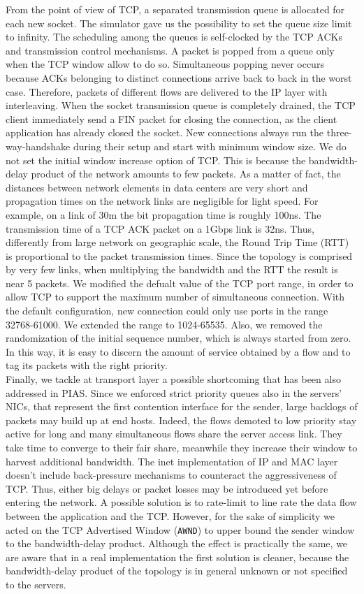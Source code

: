 From the point of view of TCP, a separated transmission queue is allocated for each new socket. The simulator gave us the possibility to set the queue size limit to infinity. The scheduling among the queues is self-clocked by the TCP ACKs and transmission control mechanisms. A packet is popped from a queue only when the TCP window allow to do so. Simultaneous popping never occurs because ACKs belonging to distinct connections arrive back to back in the worst case. Therefore, packets of different flows are delivered to the IP layer with interleaving. When the socket transmission queue is completely drained, the TCP client immediately send a FIN packet for closing the connection, as the client application has already closed the socket. New connections always run the three-way-handshake during their setup and start with minimum window size. We do not set the initial window increase option of TCP. This is because the bandwidth-delay product of the network amounts to few packets. As a matter of fact, the distances between network elements in data centers are very short and propagation times on the network links are negligible for light speed. For example, on a link of 30m the bit propagation time is roughly 100ns. The transmission time of a TCP ACK packet on a 1Gbps link is 32ns. Thus, differently from large network on geographic scale, the Round Trip Time (RTT) is proportional to the packet transmission times. Since the topology is comprised by very few links, when multiplying the bandwidth and the RTT the result is near 5 packets.
We modified the defualt value of the TCP port range, in order to allow TCP to support the maximum number of simultaneous connection. With the default configuration, new connection could only use ports in the range 32768-61000. We extended the range to 1024-65535. Also, we removed the randomization of the initial sequence number, which is always started from zero. In this way, it is easy to discern the amount of service obtained by a flow and to tag its packets with the right priority. \\
Finally, we tackle at transport layer a possible shortcoming that has been also addressed in PIAS. Since we enforced strict priority queues also in the servers' NICs, that represent the first contention interface for the sender, large backlogs of packets may build up at end hosts. Indeed, the flows demoted to low priority stay active for long and many simultaneous flows share the server access link. They take time to converge to their fair share, meanwhile they increase their window to harvest additional bandwidth. The inet implementation of IP and MAC layer doesn't include back-pressure mechanisms to counteract the aggressiveness of TCP. Thus, either big delays or packet losses may be introduced yet before entering the network. A possible solution is to rate-limit to line rate the data flow between the application and the TCP. However, for the sake of simplicity we acted on the TCP Advertised Window (\texttt{AWND}) to upper bound the sender window to the bandwidth-delay product. Although the effect is practically the same, we are aware that in a real implementation the first solution is cleaner, because the bandwidth-delay product of the topology is in general unknown or not specified to the servers. 
